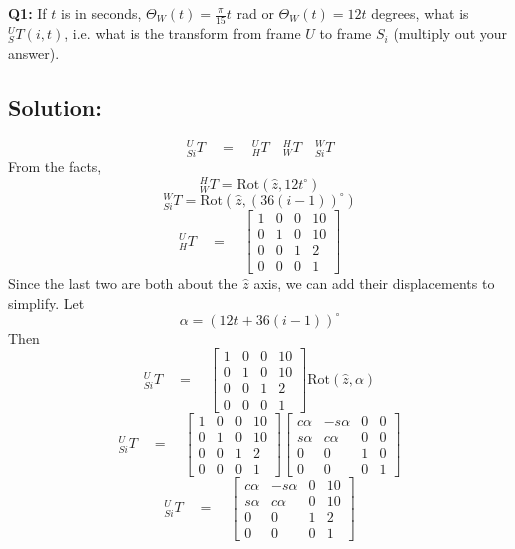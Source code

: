 \begin{ExampleCont}
{\bf Q1:}
If $t$ is in seconds, $\Theta_W(t) =  \frac{\pi}{15}t$ rad or
$\Theta_W(t) =  12t$ degrees, what is $^U_ST(i,t)$, i.e. what is the
transform from frame $U$ to frame $S_i$ (multiply out your answer).

\subsection*{Solution:}

\[
{^U_{Si}T} \quad= \quad {^U_HT} \quad {^H_WT} \quad {^W_{Si}T}
\]
From the facts,
\[
{^H_WT} = \mathrm{Rot}(\hat{z}, 12t^{\circ})
\]
\[
{^W_{Si}T} =  \mathrm{Rot}(\hat{z}, (36(i-1))^{\circ} )
\]
\[
{^U_{H}T} \quad= \quad
\begin{bmatrix}
1 & 0 & 0 & 10	\\
0 & 1 & 0 & 10 	\\
0 & 0 & 1 &  2  \\
0 & 0 & 0 &  1
\end{bmatrix}
\]
Since the last two are both about the $\hat{z}$ axis, we can add their displacements to simplify.  Let
\[
\alpha = (12t + 36(i-1))^{\circ}
\]
Then
\[
{^U_{Si}T} \quad= \quad
\begin{bmatrix}
1 & 0 & 0 & 10	\\
0 & 1 & 0 & 10 	\\
0 & 0 & 1 &  2  \\
0 & 0 & 0 &  1
\end{bmatrix}
\mathrm{Rot}(\hat{z}, \alpha)
\]
\[
{^U_{Si}T} \quad= \quad
\begin{bmatrix}
1 & 0 & 0 & 10	\\
0 & 1 & 0 & 10 	\\
0 & 0 & 1 &  2  \\
0 & 0 & 0 &  1
\end{bmatrix}
\begin{bmatrix}
c\alpha & -s\alpha & 0 & 0	\\
s\alpha &  c\alpha & 0 & 0 	\\
0 & 0 & 1 &  0  \\
0 & 0 & 0 &  1
\end{bmatrix}
\]
\[
{^U_{Si}T} \quad= \quad
\begin{bmatrix}
c\alpha & -s\alpha & 0 & 10	\\
s\alpha &  c\alpha & 0 & 10 	\\
0 & 0 & 1 &  2  \\
0 & 0 & 0 &  1
\end{bmatrix}
\]


\end{ExampleCont}
